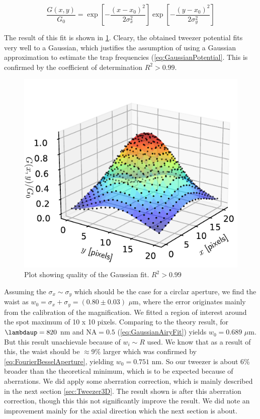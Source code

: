 \begin{equation}\label{eq:2DGaussian}
    \frac{G(x,y)}{G_0} =  
    \exp{\left[ -\frac{(x-x_0)^2}{2\sigma_x^2}\right]}
    \exp{\left[ -\frac{(y-x_0)^2}{2\sigma_y^2}\right]}
\end{equation}

The result of this fit is shown in \cref{fig:3DFitShowing}. 
Cleary, the obtained tweezer potential fits very well to a Gaussian, which justifies the assumption of using a Gaussian approximation to estimate the trap frequencies (\cref{eq:GaussianPotential}. 
This is confirmed by the coefficient of determination $R^2 > 0.99$.

\begin{figure}
    \centering
    \includegraphics[width=0.5\linewidth]{figures/3DSpotFitGaussian.pdf}
    \caption{Plot showing quality of the Gaussian fit. $R^2 > 0.99$}
    \label{fig:3DFitShowing}
\end{figure}

Assuming the $\sigma_x \sim \sigma_y$ which should be the case for a circlar aperture, we find the waist as $w_0 = \sigma_x + \sigma_y = (0.80 \pm 0.03)$ $\mu$m, where the error originates mainly from the calibration of the magnification. 
We fitted a region of interest around the spot maximum of 10 x 10 pixels. 
Comparing to the theory result, for $\lambdaup = 820$ nm and $\text{NA} = 0.5$ (\cref{eq:GaussianAiryFit}) yields $w_0 = 0.689$ $\mu$m. 
But this result unachievale because of $w_i \sim R$ used. 
We know that as a result of this, the waist should be $\approx$9\% larger \cite{Sortais2007} which was confirmed by \cref{eq:FourierBesselAperture}, yielding $w_0 = 0.751$ nm. 
So our tweezer is about 6\% broader than the theoretical minimum, which is to be expected because of aberrations. 
We did apply some aberration correction, which is mainly described in the next section \cref{sec:Tweezer3D}.
The result shown is after this aberration correction, though this this not significantly improve the result. 
We did note an improvement mainly for the axial direction which the next section is about. 

